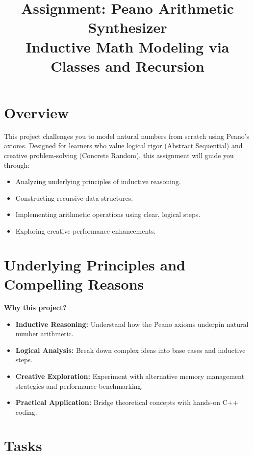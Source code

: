 \documentclass[12pt]{article}
\title{Assignment: Peano Arithmetic Synthesizer \\ \small Inductive Math Modeling via Classes and Recursion}
\author{}
\date{}
\begin{document}
\maketitle

\section*{Overview}
This project challenges you to model natural numbers from scratch using Peano's axioms. Designed for learners who value logical rigor (Abstract Sequential) and creative problem-solving (Concrete Random), this assignment will guide you through:
\begin{itemize}[leftmargin=*]
    \item Analyzing underlying principles of inductive reasoning.
    \item Constructing recursive data structures.
    \item Implementing arithmetic operations using clear, logical steps.
    \item Exploring creative performance enhancements.
\end{itemize}

\section{Underlying Principles and Compelling Reasons}
\textbf{Why this project?}
\begin{itemize}[leftmargin=*]
    \item \textbf{Inductive Reasoning:} Understand how the Peano axioms underpin natural number arithmetic.
    \item \textbf{Logical Analysis:} Break down complex ideas into base cases and inductive steps.
    \item \textbf{Creative Exploration:} Experiment with alternative memory management strategies and performance benchmarking.
    \item \textbf{Practical Application:} Bridge theoretical concepts with hands-on C++ coding.
\end{itemize}

\section{Tasks}
\end{document}

